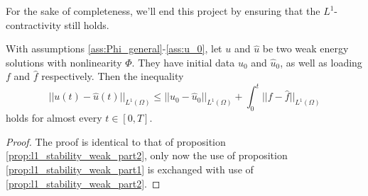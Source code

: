 \documentclass[11pt, a4paper]{article}
\begin{document}
For the sake of completeness, we'll end this project by ensuring that the $L^1$-contractivity still holds.

\begin{lemma}
\label{lem:l1_stability_weak_final}
With assumptions \ref{ass:Phi_general}-\ref{ass:u_0},  let $u$ and $\hat{u}$ be two weak energy solutions with nonlinearity $\Phi$. They have initial data $u_0$ and $\hat{u}_0$, as well as loading $f$ and $\hat{f}$ respectively. Then the inequality
\begin{equation}
||u(t) - \hat{u}(t)||_{L^1(\Omega)} \leq ||u_0 - \hat{u}_0||_{L^1(\Omega)} + \int_0^t||f-\hat{f}||_{L^1(\Omega)}
\end{equation}
holds for almost every $t\in [0,T]$.
\end{lemma}

\begin{proof}
The proof is identical to that of proposition \ref{prop:l1_stability_weak_part2}, only now the use of proposition \ref{prop:l1_stability_weak_part1} is exchanged with use of \ref{prop:l1_stability_weak_part2}.
\end{proof}





\newpage


\end{document}
